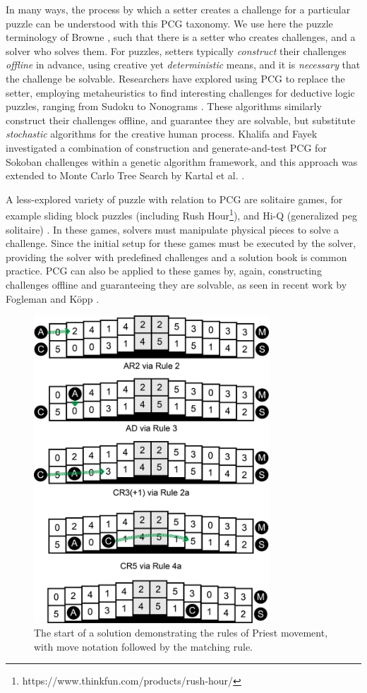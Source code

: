 \documentclass[10pt,journal,compsoc]{IEEEtran}
\begin{document}
In many ways, the process by which a setter creates a challenge for a particular puzzle can be understood with this PCG taxonomy. We use here the puzzle terminology of Browne \cite{PUZZLENATURE}, such that there is a setter who creates challenges, and a solver who solves them.
For puzzles, setters typically {\it construct} their challenges {\it offline} in advance, using creative yet {\it deterministic} means, and it is {\it necessary} that the challenge be solvable. Researchers have explored using PCG to replace the setter, employing metaheuristics to find interesting challenges for deductive logic puzzles, ranging from Sudoku \cite{SUDOKU} to Nonograms \cite{NONOGRAM}. These algorithms similarly construct their challenges offline, and guarantee they are solvable, but substitute {\it stochastic} algorithms for the creative human process.
Khalifa and Fayek\cite{PUZZLELANG} investigated a combination of construction and generate-and-test PCG for Sokoban challenges within a genetic algorithm framework, and this approach was extended to Monte Carlo Tree Search by Kartal et al. \cite{SOKOBAN}.

A less-explored variety of puzzle with relation to PCG 
are solitaire games, for example
sliding block puzzles \cite{FIFTEEN} (including Rush Hour\footnote{https://www.thinkfun.com/products/rush-hour/}), 
and Hi-Q (generalized peg solitaire) \cite{PEG}. In these games, solvers must manipulate physical pieces to solve a challenge. Since the initial setup for these games must be executed by the solver, providing the solver with predefined challenges and a solution book is common practice. PCG can also be applied to these games by, again, constructing challenges offline and guaranteeing they are solvable, as seen in recent work by Fogleman \cite{RUSHHOUR} and K{\"o}pp \cite{TANGRAM}. 

\begin{figure}[t]
\centering
\includegraphics[width=8.8cm]{priestrulesfixed.png}
\caption{The start of a solution demonstrating the rules of Priest movement, with move notation followed by the matching rule. }
\label{fig:priestrules}
\end{figure}
\end{document}
